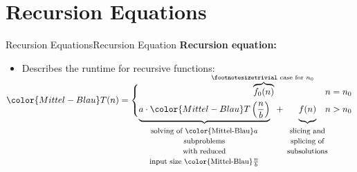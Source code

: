 
\section{Recursion Equations}

\begin{frame}{Recursion Equations}{Recursion Equation}
  \textbf{Recursion equation:}
  \begin{itemize}
    \item
      Describes the runtime for recursive functions:
  \end{itemize}
  \vspace{2em}
  \begin{displaymath}
    {\color{Mittel-Blau}T(n)} =
    \begin{cases}
      \hfill
      \smash{
        \overbrace{f_0(n)}^\text{%
          \footnotesize%
          trivial case for $n_0$
        }
      }
      \vphantom{f_0(n)} & n = n_0\\[0.5em]
      \smash{
        \underbrace{
          a \cdot {\color{Mittel-Blau}T\left(\frac{n}{b}\right)}
        }_\text{
          \footnotesize%
          \begin{tabular}{c}
            \text{solving of {\color{Mittel-Blau}$a$}}\\
            \text{subproblems}\\
            \text{with reduced}\\
            \text{input size {\color{Mittel-Blau}$\frac{n}{b}$}}
          \end{tabular}
        }
      } \hspace{0.5em} + \hspace{1.5em}
      \smash{
        \underbrace{
          f(n)
          \vphantom{\left(\frac{n}{b}\right)}
        }_\text{
          \makebox[0pt][c]{
            \footnotesize%
            \begin{tabular}{c}
              slicing and\\
              splicing of\\
              subsolutions
            \end{tabular}
          }
        }
      }
      \vphantom{\left(\frac{n}{b}\right)}
      &n > n_0
    \end{cases}
  \end{displaymath}
  \vspace{4em}
\end{frame}

